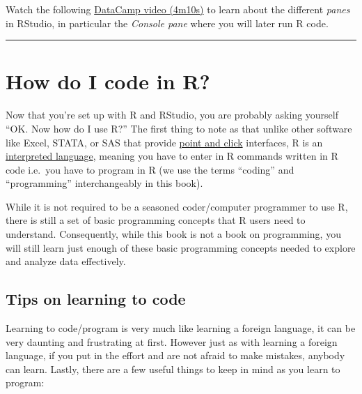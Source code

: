 \documentclass[
]{book}
\begin{document}
Watch the following \href{https://campus.datacamp.com/courses/working-with-the-rstudio-ide-part-1/orientation?ex=5}{DataCamp video (4m10s)} to learn about the different \emph{panes} in RStudio, in particular the \emph{Console pane} where you will later run R code.

\begin{center}\rule{0.5\linewidth}{0.5pt}\end{center}

\hypertarget{code}{%
\section{How do I code in R?}\label{code}}

Now that you're set up with R and RStudio, you are probably asking yourself ``OK. Now how do I use R?'' The first thing to note as that unlike other software like Excel, STATA, or SAS that provide \href{https://en.wikipedia.org/wiki/Point_and_click}{point and click} interfaces, R is an \href{https://en.wikipedia.org/wiki/Interpreted_language}{interpreted language}, meaning you have to enter in R commands written in R code i.e.~you have to program in R (we use the terms ``coding'' and ``programming'' interchangeably in this book).

While it is not required to be a seasoned coder/computer programmer to use R, there is still a set of basic programming concepts that R users need to understand. Consequently, while this book is not a book on programming, you will still learn just enough of these basic programming concepts needed to explore and analyze data effectively.

\hypertarget{tips-on-learning-to-code}{%
\subsection{Tips on learning to code}\label{tips-on-learning-to-code}}

Learning to code/program is very much like learning a foreign language, it can be very daunting and frustrating at first. However just as with learning a foreign language, if you put in the effort and are not afraid to make mistakes, anybody can learn. Lastly, there are a few useful things to keep in mind as you learn to program:
\end{document}

